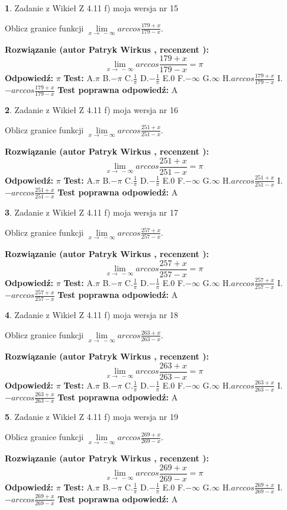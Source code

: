 \documentclass[12pt, a4paper]{article}
\theoremstyle{definition} %
\newtheorem{zad}{}
\newcommand{\zadStart}[1]{\begin{zad}#1\newline}
\newcommand{\zadStop}{\end{zad}}
\newcommand{\rozwStart}[2]{\noindent \textbf{Rozwiązanie (autor #1 , recenzent #2): }\newline}
\newcommand{\rozwStop}{\newline}
\newcommand{\odpStart}{\noindent \textbf{Odpowiedź:}\newline}
\newcommand{\odpStop}{\newline}
\newcommand{\testStart}{\noindent \textbf{Test:}\newline}
\newcommand{\testStop}{\newline}
\newcommand{\kluczStart}{\noindent \textbf{Test poprawna odpowiedź:}\newline}
\newcommand{\kluczStop}{\newline}
\begin{document}
\zadStart{Zadanie z Wikieł Z 4.11 f) moja wersja nr 15}

Oblicz granice funkcji $\lim\limits_{x\to\ -\infty}arccos\frac{179+x}{179-x}$.
\zadStop
\rozwStart{Patryk Wirkus}{}
$$\lim\limits_{x\to\ -\infty}arccos\frac{179+x}{179-x} = \pi$$
\rozwStop
\odpStart
$\pi$
\odpStop
\testStart
A.$\pi$ B.$-\pi$ C.$\frac{1}{\pi}$ D.$-\frac{1}{\pi}$ E.$0$ F.$-\infty$ G.$\infty$ H.$arccos\frac{179+x}{179-x}$ I.$-arccos\frac{179+x}{179-x}$
\testStop
\kluczStart
A
\kluczStop



\zadStart{Zadanie z Wikieł Z 4.11 f) moja wersja nr 16}

Oblicz granice funkcji $\lim\limits_{x\to\ -\infty}arccos\frac{251+x}{251-x}$.
\zadStop
\rozwStart{Patryk Wirkus}{}
$$\lim\limits_{x\to\ -\infty}arccos\frac{251+x}{251-x} = \pi$$
\rozwStop
\odpStart
$\pi$
\odpStop
\testStart
A.$\pi$ B.$-\pi$ C.$\frac{1}{\pi}$ D.$-\frac{1}{\pi}$ E.$0$ F.$-\infty$ G.$\infty$ H.$arccos\frac{251+x}{251-x}$ I.$-arccos\frac{251+x}{251-x}$
\testStop
\kluczStart
A
\kluczStop



\zadStart{Zadanie z Wikieł Z 4.11 f) moja wersja nr 17}

Oblicz granice funkcji $\lim\limits_{x\to\ -\infty}arccos\frac{257+x}{257-x}$.
\zadStop
\rozwStart{Patryk Wirkus}{}
$$\lim\limits_{x\to\ -\infty}arccos\frac{257+x}{257-x} = \pi$$
\rozwStop
\odpStart
$\pi$
\odpStop
\testStart
A.$\pi$ B.$-\pi$ C.$\frac{1}{\pi}$ D.$-\frac{1}{\pi}$ E.$0$ F.$-\infty$ G.$\infty$ H.$arccos\frac{257+x}{257-x}$ I.$-arccos\frac{257+x}{257-x}$
\testStop
\kluczStart
A
\kluczStop



\zadStart{Zadanie z Wikieł Z 4.11 f) moja wersja nr 18}

Oblicz granice funkcji $\lim\limits_{x\to\ -\infty}arccos\frac{263+x}{263-x}$.
\zadStop
\rozwStart{Patryk Wirkus}{}
$$\lim\limits_{x\to\ -\infty}arccos\frac{263+x}{263-x} = \pi$$
\rozwStop
\odpStart
$\pi$
\odpStop
\testStart
A.$\pi$ B.$-\pi$ C.$\frac{1}{\pi}$ D.$-\frac{1}{\pi}$ E.$0$ F.$-\infty$ G.$\infty$ H.$arccos\frac{263+x}{263-x}$ I.$-arccos\frac{263+x}{263-x}$
\testStop
\kluczStart
A
\kluczStop



\zadStart{Zadanie z Wikieł Z 4.11 f) moja wersja nr 19}

Oblicz granice funkcji $\lim\limits_{x\to\ -\infty}arccos\frac{269+x}{269-x}$.
\zadStop
\rozwStart{Patryk Wirkus}{}
$$\lim\limits_{x\to\ -\infty}arccos\frac{269+x}{269-x} = \pi$$
\rozwStop
\odpStart
$\pi$
\odpStop
\testStart
A.$\pi$ B.$-\pi$ C.$\frac{1}{\pi}$ D.$-\frac{1}{\pi}$ E.$0$ F.$-\infty$ G.$\infty$ H.$arccos\frac{269+x}{269-x}$ I.$-arccos\frac{269+x}{269-x}$
\testStop
\kluczStart
A
\kluczStop
\end{document}
